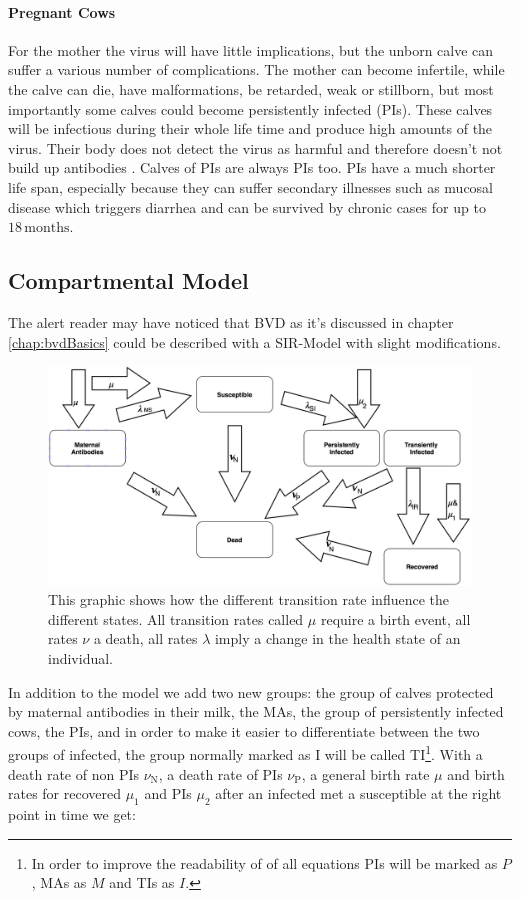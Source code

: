 \paragraph{Pregnant Cows}
For the mother the virus will have little implications, but the unborn calve can suffer a various number of complications. The mother can become infertile, while the calve can die, have malformations, be retarded, weak or stillborn, but most importantly some calves could become persistently infected (PIs). These calves will be infectious during their whole life time and produce high amounts of the virus. Their body does not detect the virus as harmful and therefore doesn't not build up antibodies \citep{personalCom}. Calves of PIs are always PIs too. PIs have a much shorter life span, especially because they can suffer secondary illnesses such as mucosal disease which triggers diarrhea and can be survived by chronic cases for up to $18\,\text{months}$.

\subsection{Compartmental Model}
The alert reader may have noticed that BVD as it's discussed in chapter \ref{chap:bvdBasics} could be described with a SIR-Model with slight modifications. 
\begin{figure}[htbp]
\centering
\noindent\includegraphics[width=\linewidth,height=\textheight,
keepaspectratio]{bvdDia.png} \caption[BVD Disease Spread Illustration]{This graphic shows how the different transition rate influence the different states. All transition rates called $\mu$ require a birth event, all rates $\nu$ a death, all rates $\lambda$ imply a change in the health state of an individual.}
\label{fig:bvdDia}
\end{figure}
In addition to the model we add two new groups: the group of calves protected by maternal antibodies in their milk, the MAs, the group of persistently infected cows, the PIs, and in order to make it easier to differentiate between the two groups of infected, the group normally marked as I will be called TI\footnote{In order to improve the readability of of all equations PIs will be marked as $P$, MAs as $M$ and TIs as $I$.}.
 With a death rate of non PIs $\nu_\text{N}$, a death rate of PIs $\nu_\text{P}$, a general birth rate $\mu$ and birth rates for recovered $\mu_1$ and PIs $\mu_2$ after an infected met a susceptible at the right point in time we get:

